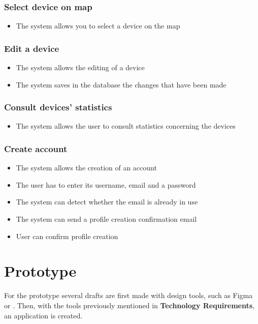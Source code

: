 \documentclass{scrreprt}
\begin{document}
\subsubsection{Select device on map}

\begin{itemize}
    \item The system allows you to select a device on the map
\end{itemize}

\subsubsection{Edit a device}

\begin{itemize}
    \item The system allows the editing of a device
    \item The system saves in the database the changes that have been made
\end{itemize}

\subsubsection{Consult devices' statistics}

\begin{itemize}
    \item The system allows the user to consult statistics concerning the devices
\end{itemize}

\subsubsection{Create account}

\begin{itemize}
    \item The system allows the creation of an account
    \item The user has to enter its username, email and a password
    \item The system can detect whether the email is already in use
    \item The system can send a profile creation confirmation email
    \item User can confirm profile creation
\end{itemize}

\section{Prototype}

For the prototype several drafts are first made with design tools, such as Figma or . Then,
with the tools previously mentioned in \textbf{Technology Requirements}, an application is created.



\end{document}
